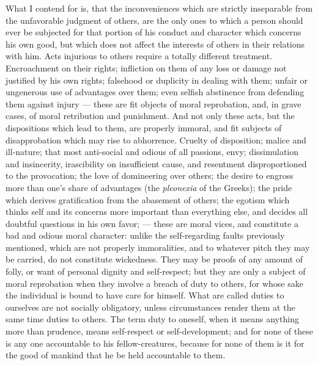 \documentclass[12pt]{report}
\begin{document}
What I contend for is, that the inconveniences which are strictly inseparable from the unfavorable judgment of others, are the only ones to which a person should ever be subjected for that portion of his conduct and character which concerns his own good, but which does not affect the interests of others in their relations with him. Acts injurious to others require a totally different treatment. Encroachment on their rights; infliction on them of any loss or damage not justified by his own rights; falsehood or duplicity in dealing with them; unfair or ungenerous use of advantages over them; even selfish abstinence from defending them against injury — these are fit objects of moral reprobation, and, in grave cases, of moral retribution and punishment. And not only these acts, but the dispositions which lead to them, are properly immoral, and fit subjects of disapprobation which may rise to abhorrence. Cruelty of disposition; malice and ill-nature; that most anti-social and odious of all passions, envy; dissimulation and insincerity, irascibility on insufficient cause, and resentment disproportioned to the provocation; the love of domineering over others; the desire to engross more than one's share of advantages (the \textit{pleonexia} of the Greeks); the pride which derives gratification from the abasement of others; the egotism which thinks self and its concerns more important than everything else, and decides all doubtful questions in his own favor; — these are moral vices, and constitute a bad and odious moral character: unlike the self-regarding faults previously mentioned, which are not properly immoralities, and to whatever pitch they may be carried, do not constitute wickedness. They may be proofs of any amount of folly, or want of personal dignity and self-respect; but they are only a subject of moral reprobation when they involve a breach of duty to others, for whose sake the individual is bound to have care for himself. What are called duties to ourselves are not socially obligatory, unless circumstances render them at the same time duties to others. The term duty to oneself, when it means anything more than prudence, means self-respect or self-development; and for none of these is any one accountable to his fellow-creatures, because for none of them is it for the good of mankind that he be held accountable to them.
\end{document}
